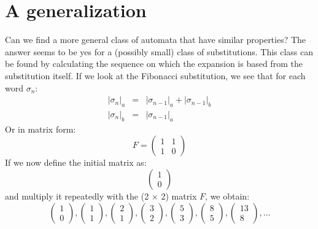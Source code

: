 \documentclass{article}
\theoremstyle{definition}
\begin{document}
\section{A generalization}
Can we find a more general class of automata that have similar properties? The 
answer seems to be yes for a (possibly small) class of substitutions. This 
class can be found by calculating the sequence on which the expansion is based 
from the substitution itself. If we look at the Fibonacci substitution, we see 
that for each word $\sigma_n$:
\begin{eqnarray*}
|\sigma_n|_a &=& |\sigma_{n - 1}|_a + |\sigma_{n - 1}|_b\\
|\sigma_n|_b &=& |\sigma_{n - 1}|_a
\end{eqnarray*}
Or in matrix form:
\begin{displaymath} F = \left( \begin{array}{cc}
1 & 1\\
1 & 0
\end{array} \right) \end{displaymath}
If we now define the initial matrix as:
\begin{displaymath} \left( \begin{array}{c}
1 \\
0 
\end{array} \right) \end{displaymath}
and multiply it repeatedly with the (2 $\times$ 2) matrix $F$, we obtain:
\begin{displaymath} 
\left( \begin{array}{c}
1 \\
0 
\end{array} \right),
\left( \begin{array}{c}
1 \\
1 
\end{array} \right),
\left( \begin{array}{c}
2 \\
1 
\end{array} \right),
\left( \begin{array}{c}
3 \\
2 
\end{array} \right),
\left( \begin{array}{c}
5 \\
3 
\end{array} \right),
\left( \begin{array}{c}
8 \\
5 
\end{array} \right),
\left( \begin{array}{c}
13 \\
8 
\end{array} \right), \ldots
\end{displaymath}
\end{document}
